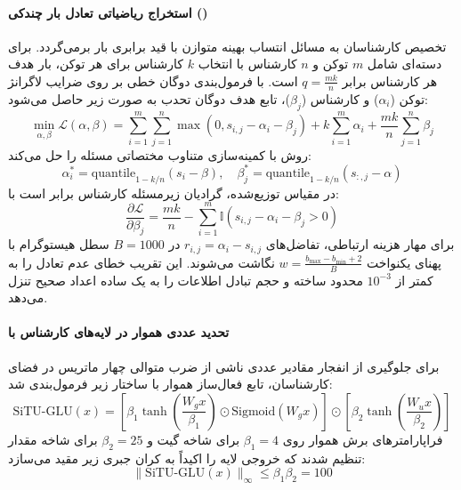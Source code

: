 \paragraph*{استخراج ریاضیاتی تعادل بار چندکی ()}
تخصیص کارشناسان به مسائل انتساب بهینه متوازن با قید برابری بار برمی‌گردد. برای دسته‌ای شامل $m$ توکن و $n$ کارشناس با انتخاب $k$ کارشناس برای هر توکن، بار هدف هر کارشناس برابر $q = \frac{mk}{n}$ است. با فرمول‌بندی دوگان خطی بر روی ضرایب لاگرانژ توکن ($\alpha_i$) و کارشناس ($\beta_j$)، تابع هدف دوگان تحدب به صورت زیر حاصل می‌شود:
\begin{equation}
    \min_{\alpha, \beta} \mathcal{L}(\alpha, \beta) = \sum_{i=1}^m \sum_{j=1}^n \max(0, s_{i,j} - \alpha_i - \beta_j) + k \sum_{i=1}^m \alpha_i + \frac{mk}{n} \sum_{j=1}^n \beta_j
\end{equation}
روش  با کمینه‌سازی متناوب مختصاتی مسئله را حل می‌کند:
\begin{equation}
    \alpha_i^* = \text{quantile}_{1 - k/n}(s_i - \beta), \quad \beta_j^* = \text{quantile}_{1 - k/n}(s_{:,j} - \alpha)
\end{equation}
در مقیاس توزیع‌شده، گرادیان زیرمسئله کارشناس برابر است با:
\begin{equation}
    \frac{\partial \mathcal{L}}{\partial \beta_j} = \frac{mk}{n} - \sum_{i=1}^m \mathbb{I}(s_{i,j} - \alpha_i - \beta_j > 0)
\end{equation}
برای مهار هزینه ارتباطی، تفاضل‌های $r_{i,j} = \alpha_i - s_{i,j}$ در $B = 1000$ سطل هیستوگرام با پهنای یکنواخت $w = \frac{b_{\max} - b_{\min} + 2}{B}$ نگاشت می‌شوند. این تقریب خطای عدم تعادل را به کمتر از $10^{-3}$ محدود ساخته و حجم تبادل اطلاعات را به یک  ساده اعداد صحیح تنزل می‌دهد.

\paragraph*{تحدید عددی هموار در لایه‌های کارشناس با }
برای جلوگیری از انفجار مقادیر عددی ناشی از ضرب متوالی چهار ماتریس در فضای کارشناسان، تابع فعال‌ساز هموار  با ساختار زیر فرمول‌بندی شد:
\begin{equation}
    \text{SiTU-GLU}(x) = \left[ \beta_1 \tanh\left(\frac{W_g x}{\beta_1}\right) \odot \text{Sigmoid}(W_g x) \right] \odot \left[ \beta_2 \tanh\left(\frac{W_u x}{\beta_2}\right) \right]
\end{equation}
فراپارامترهای برش هموار روی $\beta_1 = 4$ برای شاخه گیت و $\beta_2 = 25$ برای شاخه مقدار تنظیم شدند که خروجی لایه را اکیداً به کران جبری زیر مقید می‌سازد:
\begin{equation}
    \|\text{SiTU-GLU}(x)\|_\infty \le \beta_1 \beta_2 = 100
\end{equation}

